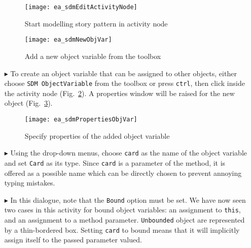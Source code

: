\begin{itemize}
\begin{figure}[htpb]
\begin{center} 
  \texttt{[image: ea\_sdmEditActivityNode]}
  \caption{Start modelling story pattern in activity node}  
  \label{fig:story_pattern}
\end{center}
\end{figure}

\begin{figure}[htp]
\begin{center}
  \texttt{[image: ea\_sdmNewObjVar]}
  \caption{Add a new object variable from the toolbox}  
  \label{fig:tool_box}
\end{center}
\end{figure}

\newpage

\item[$\blacktriangleright$] To create an object variable that can be assigned to other objects, either choose \texttt{SDM ObjectVariable} from the toolbox or
press \texttt{ctrl}, then click inside the activity node (Fig.~\ref{fig:tool_box}). A properties window will be raised for the new object
(Fig.~\ref{fig:object_variable_properties}).

\vspace{0.5cm}

\begin{figure}[htp]
\begin{center}
  \texttt{[image: ea\_sdmPropertiesObjVar]}
  \caption{Specify properties of the added object variable}  
  \label{fig:object_variable_properties}
\end{center}
\end{figure}


\item[$\blacktriangleright$] Using the drop-down menus, choose \texttt{card} as the name of the object variable and set \texttt{Card} as its type.
Since \texttt{card} is a parameter of the method, it is offered as a possible name which can be directly chosen to prevent annoying typing mistakes.

\vspace{0.5cm}

\item[$\blacktriangleright$] In this dialogue, note that the \texttt{Bound} option must be set. We have now seen two cases in this activity for bound object
variables: an assignment to \texttt{this}, and an assignment to a method parameter. \texttt{Unbounded} object are represented by a thin-bordered box. Setting
\texttt{card} to bound means that it will implicitly assign itself to the passed parameter valued.


\end{itemize}
